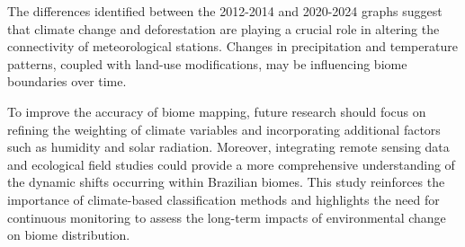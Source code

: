 \documentclass[conference]{IEEEtran}
\begin{document}
The differences identified between the 2012-2014 and 2020-2024 graphs suggest that climate change and deforestation are playing a crucial role in altering the connectivity of meteorological stations. Changes in precipitation and temperature patterns, coupled with land-use modifications, may be influencing biome boundaries over time. 

To improve the accuracy of biome mapping, future research should focus on refining the weighting of climate variables and incorporating additional factors such as humidity and solar radiation. Moreover, integrating remote sensing data and ecological field studies could provide a more comprehensive understanding of the dynamic shifts occurring within Brazilian biomes. This study reinforces the importance of climate-based classification methods and highlights the need for continuous monitoring to assess the long-term impacts of environmental change on biome distribution.
\end{document}
